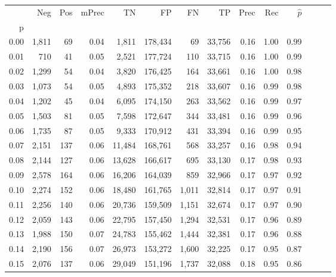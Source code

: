 \begin{tabular}{rrrrrrrrrrrrrr}
\toprule
{} &    Neg &  Pos & mPrec &       TN &       FP &      FN &      TP &  Prec &   Rec & $\hat{p}$ \\
p    &        &      &       &          &          &         &         &       &       &           \\
\midrule
0.00 &  1,811 &   69 &  0.04 &    1,811 &  178,434 &      69 &  33,756 &  0.16 &  1.00 &      0.99 \\
0.01 &    710 &   41 &  0.05 &    2,521 &  177,724 &     110 &  33,715 &  0.16 &  1.00 &      0.99 \\
0.02 &  1,299 &   54 &  0.04 &    3,820 &  176,425 &     164 &  33,661 &  0.16 &  1.00 &      0.98 \\
0.03 &  1,073 &   54 &  0.05 &    4,893 &  175,352 &     218 &  33,607 &  0.16 &  0.99 &      0.98 \\
0.04 &  1,202 &   45 &  0.04 &    6,095 &  174,150 &     263 &  33,562 &  0.16 &  0.99 &      0.97 \\
0.05 &  1,503 &   81 &  0.05 &    7,598 &  172,647 &     344 &  33,481 &  0.16 &  0.99 &      0.96 \\
0.06 &  1,735 &   87 &  0.05 &    9,333 &  170,912 &     431 &  33,394 &  0.16 &  0.99 &      0.95 \\
0.07 &  2,151 &  137 &  0.06 &   11,484 &  168,761 &     568 &  33,257 &  0.16 &  0.98 &      0.94 \\
0.08 &  2,144 &  127 &  0.06 &   13,628 &  166,617 &     695 &  33,130 &  0.17 &  0.98 &      0.93 \\
0.09 &  2,578 &  164 &  0.06 &   16,206 &  164,039 &     859 &  32,966 &  0.17 &  0.97 &      0.92 \\
0.10 &  2,274 &  152 &  0.06 &   18,480 &  161,765 &   1,011 &  32,814 &  0.17 &  0.97 &      0.91 \\
0.11 &  2,256 &  140 &  0.06 &   20,736 &  159,509 &   1,151 &  32,674 &  0.17 &  0.97 &      0.90 \\
0.12 &  2,059 &  143 &  0.06 &   22,795 &  157,450 &   1,294 &  32,531 &  0.17 &  0.96 &      0.89 \\
0.13 &  1,988 &  150 &  0.07 &   24,783 &  155,462 &   1,444 &  32,381 &  0.17 &  0.96 &      0.88 \\
0.14 &  2,190 &  156 &  0.07 &   26,973 &  153,272 &   1,600 &  32,225 &  0.17 &  0.95 &      0.87 \\
0.15 &  2,076 &  137 &  0.06 &   29,049 &  151,196 &   1,737 &  32,088 &  0.18 &  0.95 &      0.86 \\

\end{tabular}
